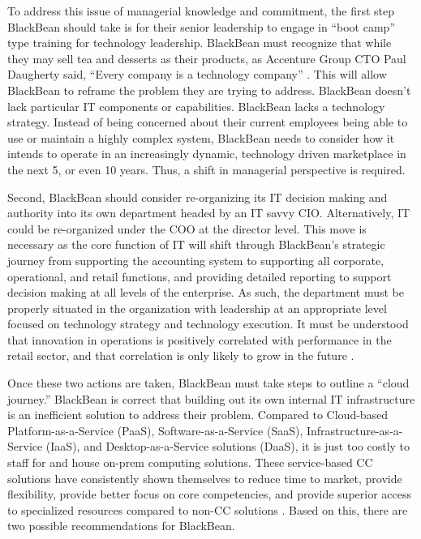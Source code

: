 To address this issue of managerial knowledge and commitment, the first step BlackBean should take is for their senior leadership to engage in ``boot camp'' type training for technology leadership. BlackBean must recognize that while they may sell tea and desserts as their products, as Accenture Group CTO Paul Daugherty said, ``Every company is a technology company'' \parencite{hristovEveryCompanyTechnology2020}. This will allow BlackBean to reframe the problem they are trying to address. BlackBean doesn't lack particular IT components or capabilities. BlackBean lacks a technology strategy. Instead of being concerned about their current employees being able to use or maintain a highly complex system, BlackBean needs to consider how it intends to operate in an increasingly dynamic, technology driven marketplace in the next 5, or even 10 years. Thus, a shift in managerial perspective is required.

Second, BlackBean should consider re-organizing its IT decision making and authority into its own department headed by an IT savvy CIO. Alternatively, IT could be re-organized under the COO at the director level. This move is necessary as the core function of IT will shift through BlackBean's strategic journey from supporting the accounting system to supporting all corporate, operational, and retail functions, and providing detailed reporting to support decision making at all levels of the enterprise. As such, the department must be properly situated in the organization with leadership at an appropriate level focused on technology strategy and technology execution. It must be understood that innovation in operations is positively correlated with performance in the retail sector, and that correlation is only likely to grow in the future \parencite{pintoInnovationStrategiesRetail2017}.

Once these two actions are taken, BlackBean must take steps to outline a ``cloud journey.'' BlackBean is correct that building out its own internal IT infrastructure is an inefficient solution to address their problem. Compared to Cloud-based Platform-as-a-Service (PaaS), Software-as-a-Service (SaaS), Infrastructure-as-a-Service (IaaS), and Desktop-as-a-Service solutions (DaaS), it is just too costly to staff for and house on-prem computing solutions. These service-based CC solutions have consistently shown themselves to reduce time to market, provide flexibility, provide better focus on core competencies, and provide superior access to specialized resources compared to non-CC solutions \parencite{wulfIaaSPaaSSaaS2021}. Based on this, there are two possible recommendations for BlackBean.

